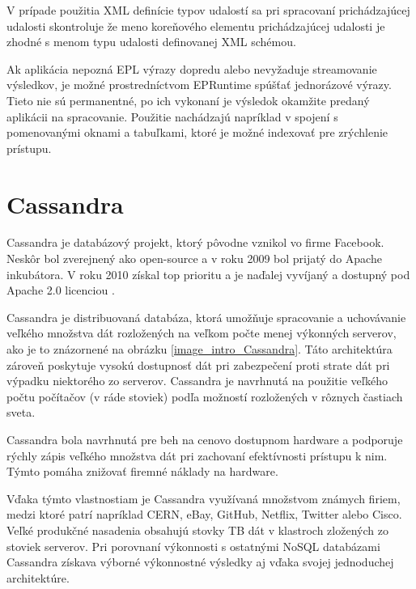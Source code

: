 		V prípade použitia XML definície typov udalostí sa pri spracovaní prichádzajúcej udalosti skontroluje že meno koreňového elementu prichádzajúcej udalosti je zhodné s menom typu udalosti definovanej XML schémou.
		
		Ak aplikácia nepozná EPL výrazy dopredu alebo nevyžaduje streamovanie výsledkov, je možné prostredníctvom EPRuntime spúšťať jednorázové výrazy. Tieto nie sú permanentné, po ich vykonaní je výsledok okamžite predaný aplikácii na spracovanie. Použitie nachádzajú napríklad v spojení s pomenovanými oknami a tabuľkami, ktoré je možné indexovať pre zrýchlenie prístupu.		

\section{Cassandra}
	Cassandra je databázový projekt, ktorý pôvodne vznikol vo firme Facebook. Neskôr bol zverejnený ako open-source a v roku 2009 bol prijatý do Apache inkubátora. V roku 2010 získal top prioritu a je naďalej vyvíjaný a dostupný pod Apache 2.0 licenciou \cite{what-is-Cassandra}.
	
	Cassandra je distribuovaná databáza, ktorá umožňuje spracovanie a uchovávanie veľkého množstva dát rozložených na veľkom počte menej výkonných serverov, ako je to znázornené na obrázku \ref{image_intro_Cassandra}. Táto architektúra zároveň poskytuje vysokú dostupnosť dát pri zabezpečení proti strate dát pri výpadku niektorého zo serverov. Cassandra je navrhnutá na použitie veľkého počtu počítačov (v ráde stoviek) podľa možností rozložených v rôznych častiach sveta.

	
	Cassandra bola navrhnutá pre beh na cenovo dostupnom hardware a podporuje rýchly zápis veľkého množstva dát pri zachovaní efektívnosti prístupu k nim. Týmto pomáha znižovať firemné náklady na hardware.
	
	Vďaka týmto vlastnostiam je Cassandra využívaná množstvom známych firiem, medzi ktoré patrí napríklad CERN, eBay, GitHub, Netflix, Twitter alebo Cisco. Veľké produkčné nasadenia obsahujú stovky TB dát v klastroch zložených zo stoviek serverov. Pri porovnaní výkonnosti s ostatnými NoSQL databázami  Cassandra získava výborné výkonnostné výsledky aj vďaka svojej jednoduchej architektúre.
	
	
